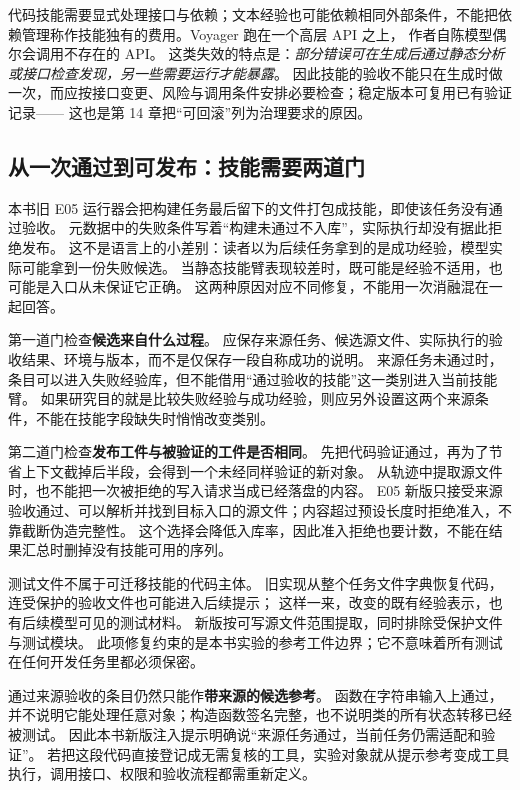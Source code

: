 代码技能需要显式处理接口与依赖；文本经验也可能依赖相同外部条件，不能把依赖管理称作技能独有的费用。Voyager 跑在一个高层 API 之上，
作者自陈模型偶尔会调用不存在的 API\cite{voyager-2305}。
这类失效的特点是：\emph{部分错误可在生成后通过静态分析或接口检查发现，另一些需要运行才能暴露}。
因此技能的验收不能只在生成时做一次，而应按接口变更、风险与调用条件安排必要检查；稳定版本可复用已有验证记录——
这也是第 14 章把``可回滚''列为治理要求的原因。

\subsection{从一次通过到可发布：技能需要两道门}
\label{sec:ch08-admission}

本书旧 E05 运行器会把构建任务最后留下的文件打包成技能，即使该任务没有通过验收。
元数据中的失败条件写着``构建未通过不入库''，实际执行却没有据此拒绝发布。
这不是语言上的小差别：读者以为后续任务拿到的是成功经验，模型实际可能拿到一份失败候选。
当静态技能臂表现较差时，既可能是经验不适用，也可能是入口从未保证它正确。
这两种原因对应不同修复，不能用一次消融混在一起回答。

第一道门检查\textbf{候选来自什么过程}。
应保存来源任务、候选源文件、实际执行的验收结果、环境与版本，而不是仅保存一段自称成功的说明。
来源任务未通过时，条目可以进入失败经验库，但不能借用``通过验收的技能''这一类别进入当前技能臂。
如果研究目的就是比较失败经验与成功经验，则应另外设置这两个来源条件，不能在技能字段缺失时悄悄改变类别。

第二道门检查\textbf{发布工件与被验证的工件是否相同}。
先把代码验证通过，再为了节省上下文截掉后半段，会得到一个未经同样验证的新对象。
从轨迹中提取源文件时，也不能把一次被拒绝的写入请求当成已经落盘的内容。
E05 新版只接受来源验收通过、可以解析并找到目标入口的源文件；内容超过预设长度时拒绝准入，不靠截断伪造完整性。
这个选择会降低入库率，因此准入拒绝也要计数，不能在结果汇总时删掉没有技能可用的序列。

测试文件不属于可迁移技能的代码主体。
旧实现从整个任务文件字典恢复代码，连受保护的验收文件也可能进入后续提示；
这样一来，改变的既有经验表示，也有后续模型可见的测试材料。
新版按可写源文件范围提取，同时排除受保护文件与测试模块。
此项修复约束的是本书实验的参考工件边界；它不意味着所有测试在任何开发任务里都必须保密。

通过来源验收的条目仍然只能作\textbf{带来源的候选参考}。
函数在字符串输入上通过，并不说明它能处理任意对象；构造函数签名完整，也不说明类的所有状态转移已经被测试。
因此本书新版注入提示明确说``来源任务通过，当前任务仍需适配和验证''。
若把这段代码直接登记成无需复核的工具，实验对象就从提示参考变成工具执行，调用接口、权限和验收流程都需重新定义。


